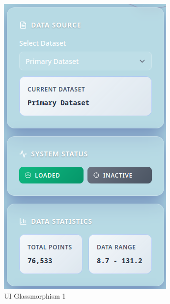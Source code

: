 \begin{figure}[ht]
    \centering
    \begin{subfigure}{0.3\textwidth}
        \centering
        \includegraphics[width=\linewidth]{images/UI-glass-1.png}
        \caption{UI Glassmorphism 1}
        \label{fig:UI-glass-1}
    \end{subfigure}
    \qquad \qquad \qquad
    \begin{subfigure}{0.3\textwidth}
        \centering

\end{subfigure}
\end{figure}
